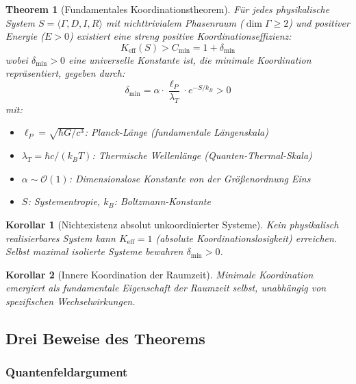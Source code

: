 \documentclass[11pt,a4paper]{article}
\newtheorem{theorem}{Theorem}
\newtheorem{corollary}{Korollar}
\begin{document}
	\begin{theorem}[Fundamentales Koordinationstheorem]
		Für jedes physikalische System $S = \langle \Gamma, D, I, R \rangle$ mit nichttrivialem Phasenraum ($\dim\Gamma \geq 2$) und positiver Energie ($E > 0$) existiert eine streng positive Koordinationseffizienz:
		\begin{equation}
			\boxed{K_{\mathrm{eff}}(S) > C_{\min} = 1 + \delta_{\min}}
		\end{equation}
		wobei $\delta_{\min} > 0$ eine universelle Konstante ist, die minimale Koordination repräsentiert, gegeben durch:
		\begin{equation}
			\delta_{\min} = \alpha \cdot \frac{\ell_P}{\lambda_T} \cdot e^{-S/k_B} > 0
		\end{equation}
		mit:
		\begin{itemize}
			\item $\ell_P = \sqrt{\hbar G/c^3}$: Planck-Länge (fundamentale Längenskala)
			\item $\lambda_T = \hbar c/(k_B T)$: Thermische Wellenlänge (Quanten-Thermal-Skala)
			\item $\alpha \sim \mathcal{O}(1)$: Dimensionslose Konstante von der Größenordnung Eins
			\item $S$: Systementropie, $k_B$: Boltzmann-Konstante
		\end{itemize}
	\end{theorem}
	
	\begin{corollary}[Nichtexistenz absolut unkoordinierter Systeme]
		Kein physikalisch realisierbares System kann $K_{\mathrm{eff}} = 1$ (absolute Koordinationslosigkeit) erreichen. Selbst maximal isolierte Systeme bewahren $\delta_{\min} > 0$.
	\end{corollary}
	
	\begin{corollary}[Innere Koordination der Raumzeit]
		Minimale Koordination emergiert als fundamentale Eigenschaft der Raumzeit selbst, unabhängig von spezifischen Wechselwirkungen.
	\end{corollary}
	
	\subsection{Drei Beweise des Theorems}
	
	\subsubsection{Quantenfeldargument}
	
\end{document}
